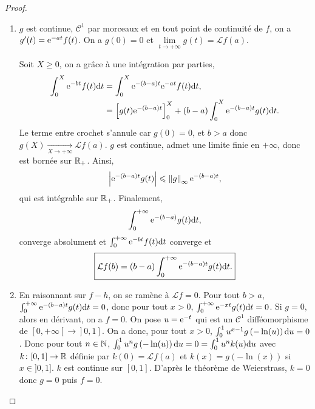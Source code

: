 \documentclass[12pt]{article}
\begin{document}
\begin{proof}
    \phantom{}
    \begin{enumerate}
        \item $g$ est continue, $\mathcal{C}^{1}$ par morceaux et en tout point de continuité de $f$, on a $g'(t)=\mathrm{e}^{-at}f(t)$. On a $g(0)=0$ et $\lim\limits_{t\to+\infty}g(t)=\mathcal{L}f(a)$. 
        
        Soit $X\geqslant0$, on a grâce à une intégration par parties,
        \begin{align}
            \int_{0}^{X}\mathrm{e}^{-bt}f(t)\mathrm{d} t
            &=\int_{0}^{X}\mathrm{e}^{-(b-a)t}\mathrm{e}^{-at}f(t)\mathrm{d} t,\\
            &=\left[g(t)\mathrm{e}^{-(b-a)t}\right]_{0}^{X}+(b-a)\int_{0}^{X}\mathrm{e}^{-(b-a)t}g(t)\mathrm{d} t.
        \end{align}
        Le terme entre crochet s'annule car $g(0)=0$, et $b>a$ donc $g(X)\xrightarrow[X\to+\infty]{}\mathcal{L}f(a)$. $g$ est continue, admet une limite finie en $+\infty$, donc est bornée sur $\mathbb{R}_{+}$. Ainsi,
        \begin{equation}
            \left\lvert\mathrm{e}^{-(b-a)t}g(t)\right\rvert\leqslant\left\lVert g\right\rVert_{\infty}\mathrm{e}^{-(b-a)t},
        \end{equation}
        qui est intégrable sur $\mathbb{R}_{+}$. Finalement, 
        \begin{equation}
            \int_{0}^{+\infty}\mathrm{e}^{-(b-a)}g(t)\mathrm{d} t,    
        \end{equation}
        converge absolument et $\int_{0}^{+\infty}\mathrm{e}^{-bt}f(t)\mathrm{d} t$ converge et 
        \begin{equation}
            \boxed{
                \mathcal{L}f(b)=(b-a)\int_{0}^{+\infty}\mathrm{e}^{-(b-a)t}g(t)\mathrm{d} t.
            }
        \end{equation}

        \item En raisonnant sur $f-h$, on se ramène à $\mathcal{L}f=0$. Pour tout $b>a$, $\int_{0}^{+\infty}\mathrm{e}^{-(b-a)t}g(t)\mathrm{d} t=0$, donc pour tout $x>0$, $\int_{0}^{+\infty}\mathrm{e}^{-xt}g(t)\mathrm{d} t=0$. Si $g=0$, alors en dérivant, on a $f=0$. On pose $u=\mathrm{e}^{-t}$ qui est un $\mathcal{C}^{1}$ difféomorphisme de $[0,+\infty[\to]0,1]$. On a donc, pour tout $x>0$, $\int_{0}^{1}u^{x-1}g\left(-\ln(u)\right)\mathrm{d} u=0$. Donc pour tout $n\in\mathbb{N}$, $\int_{0}^{1}u^{n}g\left(-\ln(u)\right)\mathrm{d} u=0=\int_{0}^{1}u^{n}k(u)\mathrm{d} u$ avec $k\colon[0,1]\to\mathbb{R}$ définie par $k(0)=\mathcal{L}f(a)$ et $k(x)=g\left(-\ln(x)\right)$ si $x\in]0,1]$. $k$ est continue sur $[0,1]$. D'après le théorème de Weierstrass, $k=0$ donc $g=0$ puis $f=0$.
    \end{enumerate}
\end{proof}
\end{document}
